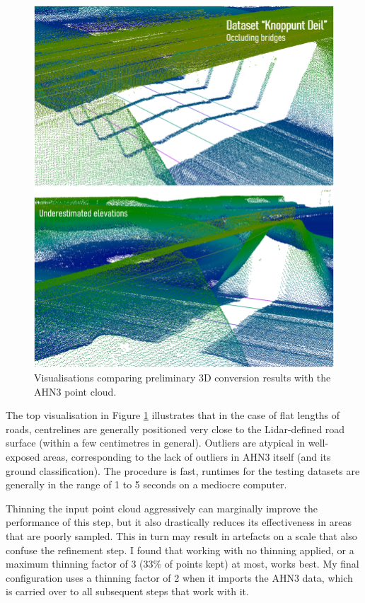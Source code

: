 \begin{figure}
    \centering
    \includegraphics[width=\linewidth]{final_report/figs/elevationestimation2.png}
    \caption{Visualisations comparing preliminary 3D conversion results with the AHN3 point cloud.}
    \label{fig:elevationestimation2}
\end{figure}

The top visualisation in Figure \ref{fig:elevationestimation2} illustrates that in the case of flat lengths of roads, centrelines are generally positioned very close to the Lidar-defined road surface (within a few centimetres in general). Outliers are atypical in well-exposed areas, corresponding to the lack of outliers in AHN3 itself (and its ground classification). The procedure is fast, runtimes for the testing datasets are generally in the range of 1 to 5 seconds on a mediocre computer.

Thinning the input point cloud aggressively can marginally improve the performance of this step, but it also drastically reduces its effectiveness in areas that are poorly sampled. This in turn may result in artefacts on a scale that also confuse the refinement step. I found that working with no thinning applied, or a maximum thinning factor of 3 (33\% of points kept) at most, works best. My final configuration uses a thinning factor of 2 when it imports the AHN3 data, which is carried over to all subsequent steps that work with it.


